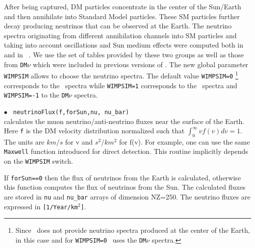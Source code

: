 \documentclass[12pt,a4paper]{article}
\begin{document}
After being captured, DM particles concentrate in the center of the Sun/Earth and 
then  annihilate into Standard Model particles. These SM particles further decay producing neutrinos that can be 
observed at the Earth.  The neutrino spectra originating from
different annihilation channels into SM particles and
taking into account oscillations  and Sun medium effects were 
computed both in
\wimpsim~\cite{Blennow:2007tw} and in 
\pppc~\cite{Baratella:2013fya}. We use the set of tables
provided by these two groups as well as  those from  {\tt DM$\nu$}
\cite{Cirelli:2005gh}  which were included in previous versions of \micro.
The new global parameter {\tt WIMPSIM}  allows to
choose  the   neutrino spectra. The default value  {\tt WIMPSIM=0} \footnote{Since \pppc\ does not provide neutrino spectra produced at the center of the
Earth, in this case  and for {\tt WIMPSIM=0} \micro\ uses the {\tt DM$\nu$} spectra.}
corresponds to the \pppc\ spectra while  {\tt WIMPSIM=1} corresponds to the
\wimpsim\  spectra and  {\tt WIMPSIM=-1}  to the 
 {\tt DM$\nu$} spectra. 
  
  
\noindent
$\bullet$ \verb| neutrinoFlux(f,forSun,nu, nu_bar)|\\
calculates the muon neutrino/anti-neutrino  fluxes  near the surface of the Earth. 
Here  \verb|f|  is  the DM velocity distribution   normalized such that 
$ \int_0^{\infty} v f(v) dv =1$. The units  are $km/s$ for v and $s^2/km^2$ for  
f(v).  For example,   one can use the same  \verb|Maxwell| 
function introduced for direct detection.  This routine implicitly depends on the {\tt WIMPSIM} switch.
  
  If {\tt forSun==0} then the flux of neutrinos from the Earth is calculated, otherwise this function computes the flux of neutrinos from the Sun.  The calculated fluxes are stored in {\tt nu} and {\tt nu\_bar}  arrays of dimension NZ=250.  
The neutrino fluxes are expressed in \verb|[1/Year/km|$^2$\verb|]|.
\end{document}
